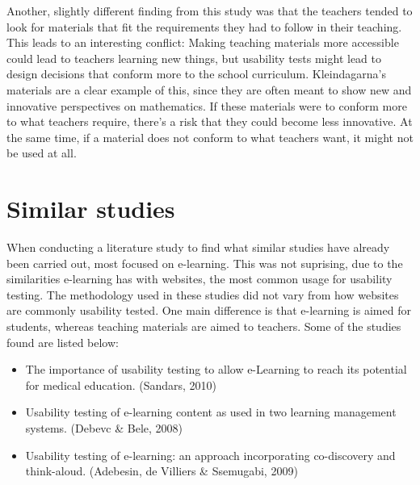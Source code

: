 Another, slightly different finding from this study was that the teachers tended to look for materials that fit the requirements they had to follow in their teaching. This leads to an interesting conflict: Making teaching materials more accessible could lead to teachers learning new things, but usability tests might lead to design decisions that conform more to the school curriculum. Kleindagarna's materials are a clear example of this, since they are often meant to show new and innovative perspectives on mathematics. If these materials were to conform more to what teachers require, there's a risk that they could become less innovative. At the same time, if a material does not conform to what teachers want, it might not be used at all.

\section{Similar studies}\vspace{-0.3cm}
When conducting a literature study to find what similar studies have already been carried out, most focused on e-learning. This was not suprising, due to the similarities e-learning has with websites, the most common usage for usability testing. The methodology used in these studies did not vary from how websites are commonly usability tested. One main difference is that e-learning is aimed for students, whereas teaching materials are aimed to teachers. Some of the studies found are listed below:
\begin{itemize}
\item The importance of usability testing to allow e-Learning to reach its potential for medical education. (Sandars, 2010)
\item Usability testing of e-learning content as used in two learning management systems. (Debevc \& Bele, 2008)
\item Usability testing of e-learning: an approach incorporating co-discovery and think-aloud. (Adebesin, de Villiers \& Ssemugabi, 2009)
\end{itemize}

